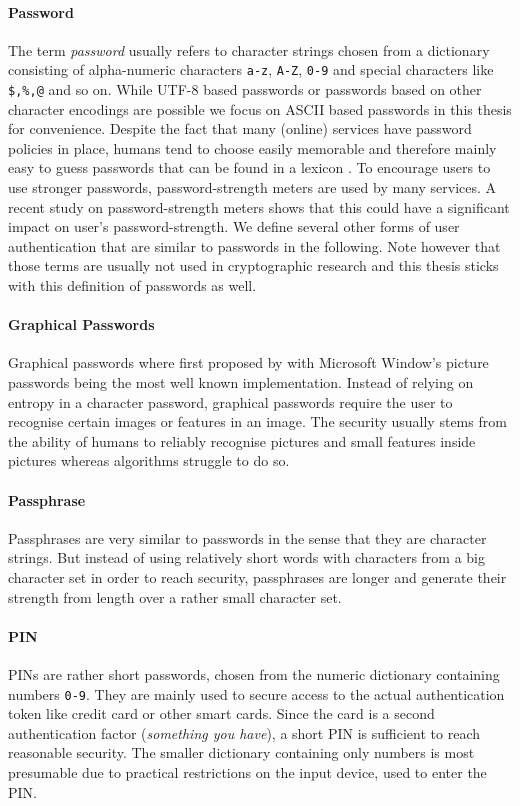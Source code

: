 \paragraph{Password}
The term \emph{password} usually refers to character strings chosen from a dictionary consisting of alpha-numeric characters \texttt{a-z}, \texttt{A-Z}, \texttt{0-9} and special characters like \texttt{\$,\%,@} and so on.
While \acs{UTF-8} based passwords or passwords based on other character encodings are possible we focus on \acs{ASCII} based passwords in this thesis for convenience.
Despite the fact that many (online) services have password policies in place, humans tend to choose easily memorable and therefore mainly easy to guess passwords that can be found in a lexicon \cite{Florencio2007,Gaw2006}.
To encourage users to use stronger passwords, password-strength meters are used by many services.
A recent study \cite{Ur2012} on password-strength meters shows that this could have a significant impact on user's password-strength.
We define several other forms of user authentication that are similar to passwords in the following.
Note however that those terms are usually not used in cryptographic research and this thesis sticks with this definition of passwords as well.

\paragraph{Graphical Passwords}
Graphical passwords where first proposed by \citet{Blonder96} with Microsoft Window's picture passwords \cite{picturepwd1,picturepwd2} being the most well known implementation.
Instead of relying on entropy in a character password, graphical passwords require the user to recognise certain images or features in an image.
The security usually stems from the ability of humans to reliably recognise pictures and small features inside pictures whereas algorithms struggle to do so.

\paragraph{Passphrase}
Passphrases are very similar to passwords in the sense that they are character strings.
But instead of using relatively short words with characters from a big character set in order to reach security, passphrases are longer and generate their strength from length over a rather small character set.

\paragraph{\acl{PIN}}
\acp{PIN} are rather short passwords, chosen from the numeric dictionary containing numbers \texttt{0-9}.
They are mainly used to secure access to the actual authentication token like credit card or other smart cards.
Since the card is a second authentication factor (\emph{something you have}), a short \ac{PIN} is sufficient to reach reasonable security.
The smaller dictionary containing only numbers is most presumable due to practical restrictions on the input device, used to enter the \ac{PIN}.

